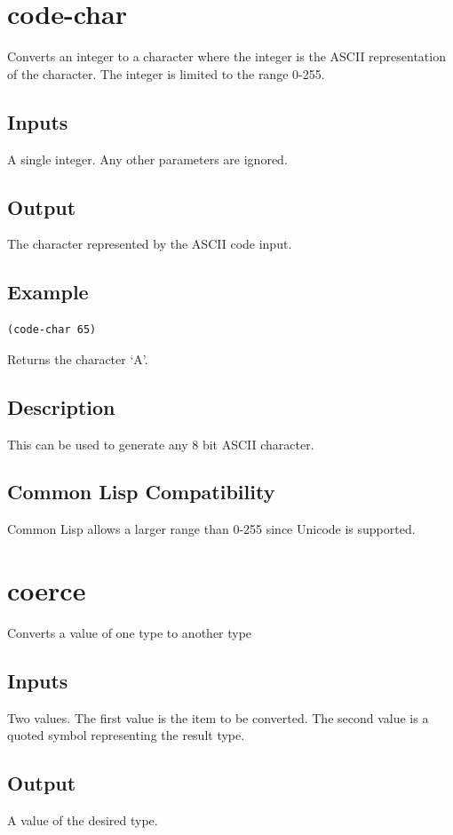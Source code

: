 \documentclass[10pt, openany]{book}
\newcommand{\cl}{Common Lisp}
\begin{document}
\section{code-char}
Converts an integer to a character where the integer is the ASCII representation of the character.  The integer is limited to the range 0-255.
\subsection{Inputs}
A single integer.  Any other parameters are ignored.
\subsection{Output}
The character represented by the ASCII code input.
\subsection{Example}
\begin{lstlisting}
(code-char 65)
\end{lstlisting}
Returns the character `A'.
\subsection{Description}
This can be used to generate any 8 bit ASCII character.
\subsection{Common Lisp Compatibility}
\cl{} allows a larger range than 0-255 since Unicode is supported.

\section{coerce}
Converts a value of one type to another type
\subsection{Inputs}
Two values.  The first value is the item to be converted.  The second value is a quoted symbol representing the result type.
\subsection{Output}
A value of the desired type.
\end{document}
